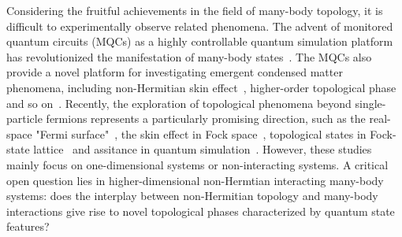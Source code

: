 \documentclass[longbibliography, aps, prx, amsmath, amssymb, amsfonts, twocolumn,superscriptaddress, footinbib]{revtex4-1}
\begin{document}
	Considering the fruitful achievements in the field of many-body topology, it is difficult to experimentally observe related phenomena. The advent of monitored quantum circuits (MQCs) as a highly controllable quantum simulation platform has revolutionized the manifestation of many-body states~\cite{skinner2019measurement,nahum2017quantum,gullans2020dynamical,koh2023measurement,li2023cross,choi2020quantum,minato2022fate,yang2025bridging,potter2022entanglement,iqbal2024non,zhang2025physics}. 
	The MQCs also provide a novel platform for investigating emergent condensed matter phenomena, including non-Hermitian skin effect~\cite{fleckenstein2022non}, higher-order topological phase~\cite{koh2024realization} and so on~\cite{iqbal2024non}. Recently, the exploration of topological phenomena beyond single-particle fermions represents a particularly promising direction, such as the real-space "Fermi surface"~\cite{shen2025observation}, the skin effect in Fock space~\cite{shen2024enhanced,shimomura2024general}, topological states in Fock-state lattice~\cite{deng2022observing} and assitance in quantum simulation~\cite{zhao2025}. However, these studies mainly focus on one-dimensional systems or non-interacting systems. A critical open question lies in higher-dimensional non-Hermtian interacting many-body systems: does the interplay between non-Hermitian topology and many-body interactions give rise to novel topological phases characterized by quantum state features? 

	
\end{document}
